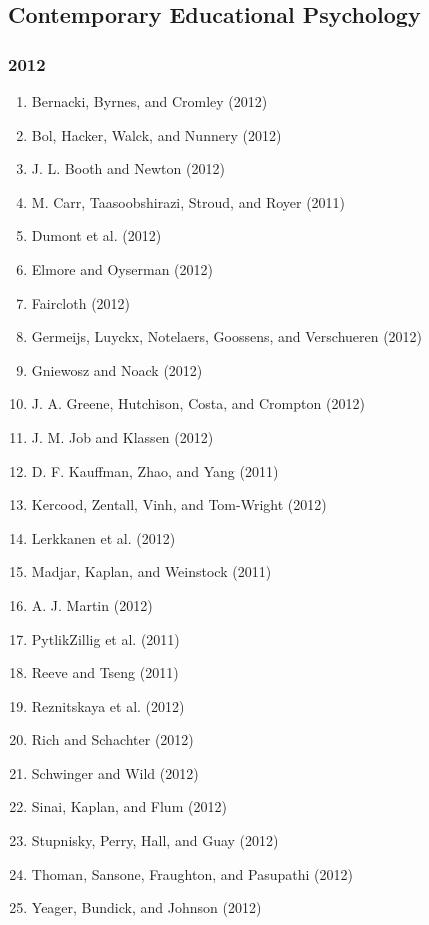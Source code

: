 \documentclass[english,man]{apa6}
\providecommand{\tightlist}{%
  \setlength{\itemsep}{0pt}\setlength{\parskip}{0pt}}
\theoremstyle{definition}
\theoremstyle{definition}
\theoremstyle{definition}
\theoremstyle{remark}
\begin{document}
\subsection{Contemporary Educational
Psychology}\label{contemporary-educational-psychology}

\subsubsection{2012}\label{section-16}

\begin{enumerate}
\def\labelenumi{\arabic{enumi})}
\tightlist
\item
  Bernacki, Byrnes, and Cromley (2012)
\item
  Bol, Hacker, Walck, and Nunnery (2012)
\item
  J. L. Booth and Newton (2012)
\item
  M. Carr, Taasoobshirazi, Stroud, and Royer (2011)
\item
  Dumont et al. (2012)
\item
  Elmore and Oyserman (2012)
\item
  Faircloth (2012)
\item
  Germeijs, Luyckx, Notelaers, Goossens, and Verschueren (2012)
\item
  Gniewosz and Noack (2012)
\item
  J. A. Greene, Hutchison, Costa, and Crompton (2012)
\item
  J. M. Job and Klassen (2012)
\item
  D. F. Kauffman, Zhao, and Yang (2011)
\item
  Kercood, Zentall, Vinh, and Tom-Wright (2012)
\item
  Lerkkanen et al. (2012)
\item
  Madjar, Kaplan, and Weinstock (2011)
\item
  A. J. Martin (2012)
\item
  PytlikZillig et al. (2011)
\item
  Reeve and Tseng (2011)
\item
  Reznitskaya et al. (2012)
\item
  Rich and Schachter (2012)
\item
  Schwinger and Wild (2012)
\item
  Sinai, Kaplan, and Flum (2012)
\item
  Stupnisky, Perry, Hall, and Guay (2012)
\item
  Thoman, Sansone, Fraughton, and Pasupathi (2012)
\item
  Yeager, Bundick, and Johnson (2012)
\end{enumerate}
\end{document}
